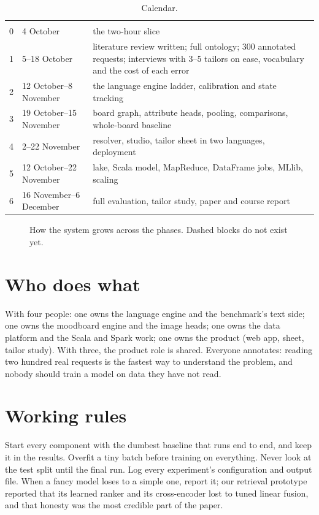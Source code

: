 \begin{table}[h]
\centering\small
\caption{Calendar.}\label{tab:cal}
\begin{tabularx}{\textwidth}{@{}P{2.0cm}P{3.0cm}L@{}}
 &  & \\
0 & 4 October & the two-hour slice\\
1 & 5--18 October & literature review written; full ontology; 300 annotated requests; interviews with 3--5 tailors on ease, vocabulary and the cost of each error\\
2 & 12 October--8 November & the language engine ladder, calibration and state tracking\\
3 & 19 October--15 November & board graph, attribute heads, pooling, comparisons, whole-board baseline\\
4 & 2--22 November & resolver, studio, tailor sheet in two languages, deployment\\
5 & 12 October--22 November & lake, Scala model, MapReduce, DataFrame jobs, MLlib, scaling\\
6 & 16 November--6 December & full evaluation, tailor study, paper and course report\\
\end{tabularx}
\end{table}

\begin{figure}[h]
\centering
\caption{How the system grows across the phases. Dashed blocks do not exist yet.}\label{fig:growth}
\end{figure}

\section{Who does what}

With four people: one owns the language engine and the benchmark's text side; one owns the moodboard engine and the image heads; one owns the data platform and the Scala and Spark work; one owns the product (web app, sheet, tailor study). With three, the product role is shared. Everyone annotates: reading two hundred real requests is the fastest way to understand the problem, and nobody should train a model on data they have not read.

\section{Working rules}

Start every component with the dumbest baseline that runs end to end, and keep it in the results. Overfit a tiny batch before training on everything. Never look at the test split until the final run. Log every experiment's configuration and output file. When a fancy model loses to a simple one, report it; our retrieval prototype reported that its learned ranker and its cross-encoder lost to tuned linear fusion, and that honesty was the most credible part of the paper.

